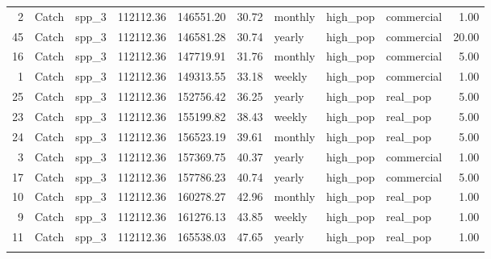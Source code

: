 \begin{longtable}{rllrrrlllr}
    2 & Catch & spp\_3 & 112112.36 & 146551.20 & 30.72 & monthly & high\_pop & commercial & 1.00 \\ 
   45 & Catch & spp\_3 & 112112.36 & 146581.28 & 30.74 & yearly & high\_pop & commercial & 20.00 \\ 
   16 & Catch & spp\_3 & 112112.36 & 147719.91 & 31.76 & monthly & high\_pop & commercial & 5.00 \\ 
    1 & Catch & spp\_3 & 112112.36 & 149313.55 & 33.18 & weekly & high\_pop & commercial & 1.00 \\ 
   25 & Catch & spp\_3 & 112112.36 & 152756.42 & 36.25 & yearly & high\_pop & real\_pop & 5.00 \\ 
   23 & Catch & spp\_3 & 112112.36 & 155199.82 & 38.43 & weekly & high\_pop & real\_pop & 5.00 \\ 
   24 & Catch & spp\_3 & 112112.36 & 156523.19 & 39.61 & monthly & high\_pop & real\_pop & 5.00 \\ 
    3 & Catch & spp\_3 & 112112.36 & 157369.75 & 40.37 & yearly & high\_pop & commercial & 1.00 \\ 
   17 & Catch & spp\_3 & 112112.36 & 157786.23 & 40.74 & yearly & high\_pop & commercial & 5.00 \\ 
   10 & Catch & spp\_3 & 112112.36 & 160278.27 & 42.96 & monthly & high\_pop & real\_pop & 1.00 \\ 
    9 & Catch & spp\_3 & 112112.36 & 161276.13 & 43.85 & weekly & high\_pop & real\_pop & 1.00 \\ 
   11 & Catch & spp\_3 & 112112.36 & 165538.03 & 47.65 & yearly & high\_pop & real\_pop & 1.00 \\ 
   \hline
\hline
\label{tab:7}
\end{longtable}
